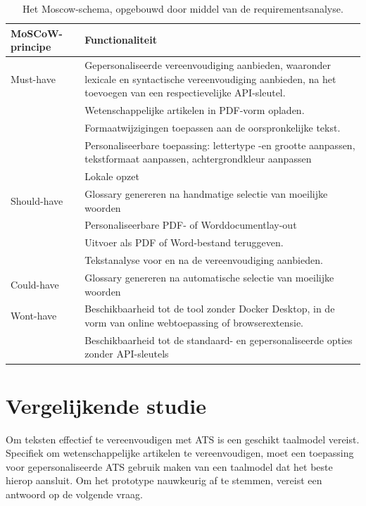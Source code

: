 \begin{center}
	\begin{table}[H]
	\begin{tabular}{ | m{4cm} | m{11cm} | } 
		\hline
		\textbf{MoSCoW-principe} & Functionaliteit \\
		\hline
		Must-have & Gepersonaliseerde vereenvoudiging aanbieden, waaronder lexicale en syntactische vereenvoudiging aanbieden, na het toevoegen van een respectievelijke API-sleutel. \\
		& Wetenschappelijke artikelen in PDF-vorm opladen. \\
		& Formaatwijzigingen toepassen aan de oorspronkelijke tekst. \\
		& Personaliseerbare toepassing: lettertype -en grootte aanpassen, tekstformaat aanpassen, achtergrondkleur aanpassen \\
		& Lokale opzet \\
		\hline
		Should-have & Glossary genereren na handmatige selectie van moeilijke woorden \\
		& Personaliseerbare PDF- of Worddocumentlay-out \\
		& Uitvoer als PDF of Word-bestand teruggeven. \\
		& Tekstanalyse voor en na de vereenvoudiging aanbieden. \\
		\hline
		Could-have & Glossary genereren na automatische selectie van moeilijke woorden \\
		\hline
		Wont-have & Beschikbaarheid tot de tool zonder Docker Desktop, in de vorm van online webtoepassing of browserextensie. \\
		& Beschikbaarheid tot de standaard- en gepersonaliseerde opties zonder API-sleutels \\
		\hline
	\end{tabular}
	\caption{Het Moscow-schema, opgebouwd door middel van de requirementsanalyse.}
	\label{img:moscow-table}
	\end{table}
\end{center}

\section{Vergelijkende studie}
\label{sec:vergelijkende-studie}

Om teksten effectief te vereenvoudigen met ATS is een geschikt taalmodel vereist. Specifiek om wetenschappelijke artikelen te vereenvoudigen, moet een toepassing voor gepersonaliseerde ATS gebruik maken van een taalmodel dat het beste hierop aansluit. Om het prototype nauwkeurig af te stemmen, vereist een antwoord op de volgende vraag.

